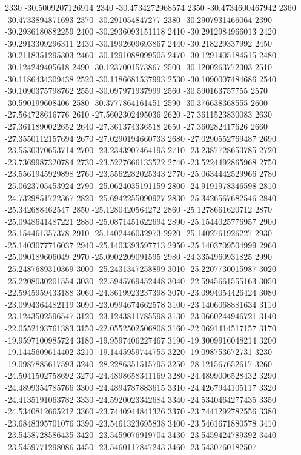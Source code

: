 {2330 -30.5009207126914
2340 -30.4734272968574
2350 -30.4734600467942
2360 -30.4733894871693
2370 -30.291054847277
2380 -30.2907931466064
2390 -30.2936180882259
2400 -30.2936093151118
2410 -30.2912984966013
2420 -30.2913309296311
2430 -30.1992609693867
2440 -30.218229337992
2450 -30.2118351295303
2460 -30.1291088099505
2470 -30.1291405184515
2480 -30.124249405618
2490 -30.1237001573867
2500 -30.1200263772303
2510 -30.1186434309438
2520 -30.1186681537993
2530 -30.1090007484686
2540 -30.1090375798762
2550 -30.097971937999
2560 -30.590163757755
2570 -30.590199608406
2580 -30.3777864161451
2590 -30.376638368555
2600 -27.564728616776
2610 -27.5602302495036
2620 -27.3611523830083
2630 -27.3611890022652
2640 -27.361374336518
2650 -27.360282417626
2660 -27.3550112157694
2670 -27.0290194660733
2680 -27.0290552769487
2690 -23.5530370653714
2700 -23.2343907464193
2710 -23.2387728653785
2720 -23.7369987320784
2730 -23.5227666133522
2740 -23.5224492865968
2750 -23.5561945929898
2760 -23.5562282025343
2770 -25.0634442529966
2780 -25.0623705453924
2790 -25.0624035191159
2800 -24.9191978346598
2810 -24.7329851722367
2820 -25.6942255090927
2830 -25.3426567682546
2840 -25.342688462547
2850 -25.1280420564272
2860 -25.1278661620712
2870 -25.0948641487221
2880 -25.0871451622694
2890 -25.1544025776957
2900 -25.154461357378
2910 -25.1402446032973
2920 -25.1402761926227
2930 -25.1403077716037
2940 -25.1403393597713
2950 -25.1403709504999
2960 -25.090189606049
2970 -25.0902209091595
2980 -24.3354960931825
2990 -25.2487689310369
3000 -25.2431347258899
3010 -25.2207730015987
3020 -25.2208030201554
3030 -22.5945769452448
3040 -22.5945661555163
3050 -22.5945959433188
3060 -24.3619923237398
3070 -23.0994054426424
3080 -23.0994364482119
3090 -23.0994674662578
3100 -23.1406068881634
3110 -23.1243502596547
3120 -23.1243811785598
3130 -23.0660244946721
3140 -22.0552193761383
3150 -22.0552502506808
3160 -22.0691414517157
3170 -19.9597100985724
3180 -19.9597406227467
3190 -19.3009916048214
3200 -19.1445609614402
3210 -19.1445959744755
3220 -19.098753672731
3230 -19.0987885617593
3240 -28.2286351515795
3250 -28.121567652617
3260 -24.5041502758692
3270 -24.4898658341169
3280 -24.4899006528432
3290 -24.4899354785766
3300 -24.4894787883615
3310 -24.4267944105117
3320 -24.4135191063782
3330 -24.5920023342684
3340 -24.5340464277435
3350 -24.5340812665212
3360 -23.7440944841326
3370 -23.7441292782556
3380 -23.6848395701076
3390 -23.5461323695838
3400 -23.5461671880578
3410 -23.5458728586435
3420 -23.5459076919704
3430 -23.5459424789392
3440 -23.5459771298086
3450 -23.5460117847243
3460 -23.5430760182507
}
